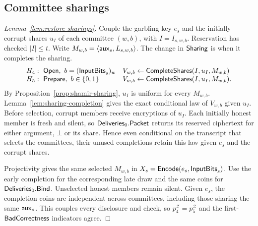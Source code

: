 \subsection{Committee sharings}
\label{sec:sharing-hybrid-proof}
\begin{proof}[Lemma~\ref{lem:restore-sharings}]
Couple the garbling key $e_s$ and the initially corrupt shares $u_I$ of
each committee $(w,b)$, with $I=I_{s,w,b}$. Reservation has checked
$|I|\leq t$. Write $M_{w,b}=\langle\mathsf{aux}_s,L_{s,w,b}\rangle$.
The change in $\mathsf{Sharing}$ is when it completes the sharing.
\[
 \begin{array}{@{}ll@{}}
  H_4:\ \Open,\ b=(\InputBits_s)_w &
      V_{w,b}\sample\CompleteShares(I,u_I,M_{w,b})\\
  H_5:\ \Prepare,\ b\in\bits &
      V_{w,b}\sample\CompleteShares(I,u_I,M_{w,b}).
 \end{array}
\]
By Proposition~\ref{prop:shamir-sharing}, $u_I$ is uniform for every
$M_{w,b}$. Lemma~\ref{lem:sharing-completion} gives the exact
conditional law of $V_{w,b}$ given $u_I$. Before selection, corrupt
members receive encryptions of $u_I$. Each initially honest member is
fresh and silent, so $\mathsf{Deliveries}_0.\mathsf{Packet}$ returns its reserved
ciphertext for either argument, $\bot$ or its share. Hence even
conditional on the transcript that selects the committees, their
unused completions retain this law given $e_s$ and the corrupt shares.

Projectivity gives the same selected $M_{w,b}$ in $X_s=\mathsf{Encode}(e_s,\mathsf{InputBits}_s)$.
Use the early completion for the corresponding late draw and the same
coins for $\mathsf{Deliveries}_0.\mathsf{Bind}$. Unselected honest members remain
silent. Given $e_s$, the completion coins are independent across
committees, including those sharing the same $\mathsf{aux}_s$. This
couples every disclosure and check, so $p_4^{\mathcal Z}=p_5^{\mathcal Z}$
and the first-$\mathsf{BadCorrectness}$ indicators agree.
\end{proof}

